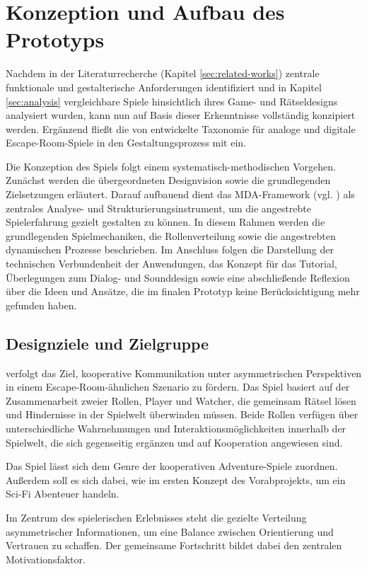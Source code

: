 \chapter{Konzeption und Aufbau des Prototyps}\label{sec:concept}
Nachdem in der Literaturrecherche (Kapitel \ref{sec:related-works}) zentrale funktionale und gestalterische Anforderungen identifiziert und in Kapitel \ref{sec:analysis} vergleichbare Spiele hinsichtlich ihres Game- und Rätseldesigns analysiert wurden, kann  nun auf Basis dieser Erkenntnisse vollständig konzipiert werden. Ergänzend fließt die von \cite{krekhov_puzzles_2021} entwickelte Taxonomie für analoge und digitale Escape-Room-Spiele in den Gestaltungsprozess mit ein.

Die Konzeption des Spiels folgt einem systematisch-methodischen Vorgehen. Zunächst werden die übergeordneten Designvision sowie die grundlegenden Zielsetzungen erläutert. Darauf aufbauend dient das \ac{MDA}-Framework (vgl. \citealp{hunicke_mda_2004}) als zentrales Analyse- und Strukturierungsinstrument, um die angestrebte Spielerfahrung gezielt gestalten zu können. In diesem Rahmen werden die grundlegenden Spielmechaniken, die Rollenverteilung sowie die angestrebten dynamischen Prozesse beschrieben. Im Anschluss folgen die Darstellung der technischen Verbundenheit der Anwendungen, das Konzept für das Tutorial, Überlegungen zum Dialog- und Sounddesign sowie eine abschließende Reflexion über die Ideen und Ansätze, die im finalen Prototyp keine Berücksichtigung mehr gefunden haben.

\section{Designziele und Zielgruppe}
 verfolgt das Ziel, kooperative Kommunikation unter asymmetrischen Perspektiven in einem Escape-Room-ähnlichen Szenario zu fördern. Das Spiel basiert auf der Zusammenarbeit zweier Rollen, Player und Watcher, die gemeinsam Rätsel lösen und Hindernisse in der Spielwelt überwinden müssen. Beide Rollen verfügen über unterschiedliche Wahrnehmungen und Interaktionsmöglichkeiten innerhalb der Spielwelt, die sich gegenseitig ergänzen und auf Kooperation angewiesen sind.

Das Spiel lässt sich dem Genre der kooperativen Adventure-Spiele zuordnen. Außerdem soll es sich dabei, wie im ersten Konzept des Vorabprojekts, um ein \ac{Sci-Fi} Abenteuer handeln.

Im Zentrum des spielerischen Erlebnisses steht die gezielte Verteilung asymmetrischer Informationen, um eine Balance zwischen Orientierung und Vertrauen zu schaffen. Der gemeinsame Fortschritt bildet dabei den zentralen Motivationsfaktor.

